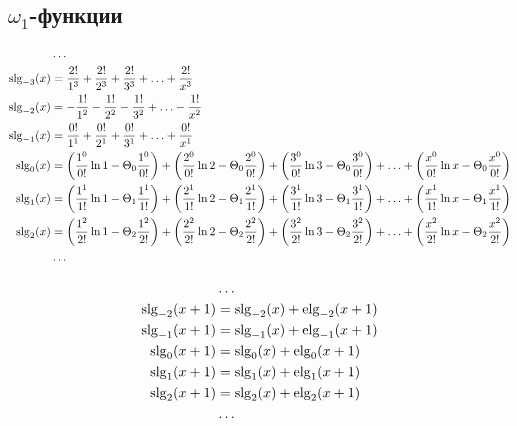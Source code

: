 \subsection{$\omega_1$-функции}

\begin{equation*} \begin{aligned}
&\ldots
\\
\operatorname{slg}_{-3}(x) &=
  \frac{2!}{1^3}
+ \frac{2!}{2^3} 
+ \frac{2!}{3^3} 
+ \ldots 
+ \frac{2!}{x^3}
\\
\operatorname{slg}_{-2}(x) &=
- \frac{1!}{1^2}
- \frac{1!}{2^2} 
- \frac{1!}{3^2} 
+ \ldots 
- \frac{1!}{x^2}
\\
\operatorname{slg}_{-1}(x) &=
  \frac{0!}{1^1}
+ \frac{0!}{2^1} 
+ \frac{0!}{3^1} 
+ \ldots 
+ \frac{0!}{x^1}
\\
\operatorname{slg}_0(x) &=
  \left( \frac{1^0}{0!} \ln{1} - \Theta_0 \frac{1^0}{0!} \right)
+ \left( \frac{2^0}{0!} \ln{2} - \Theta_0 \frac{2^0}{0!} \right) 
+ \left( \frac{3^0}{0!} \ln{3} - \Theta_0 \frac{3^0}{0!} \right) 
+ \ldots 
+ \left( \frac{x^0}{0!} \ln{x} - \Theta_0 \frac{x^0}{0!} \right)
\\
\operatorname{slg}_1(x) &=
  \left(\frac{1^1}{1!} \ln{1} - \Theta_1 \frac{1^1}{1!} \right)
+ \left( \frac{2^1}{1!} \ln{2} - \Theta_1 \frac{2^1}{1!} \right) 
+ \left( \frac{3^1}{1!} \ln{3} - \Theta_1 \frac{3^1}{1!} \right) 
+ \ldots 
+ \left( \frac{x^1}{1!} \ln{x} - \Theta_1 \frac{x^1}{1!} \right)
\\
\operatorname{slg}_2(x) &=
  \left( \frac{1^2}{2!} \ln{1} - \Theta_2 \frac{1^2}{2!} \right)
+ \left( \frac{2^2}{2!} \ln{2} - \Theta_2 \frac{2^2}{2!} \right) 
+ \left( \frac{3^2}{2!} \ln{3} - \Theta_2 \frac{3^2}{2!} \right) 
+ \ldots 
+ \left( \frac{x^2}{2!} \ln{x} - \Theta_2 \frac{x^2}{2!} \right)
\\
&\ldots
\\
\end{aligned} \end{equation*}

\begin{equation*} \begin{aligned}
&\ldots
\\
\operatorname{slg}_{-2}(x + 1) &= 
  \operatorname{slg}_{-2}(x) + \operatorname{elg}_{-2}(x + 1)
\\
\operatorname{slg}_{-1}(x + 1) &= 
  \operatorname{slg}_{-1}(x) + \operatorname{elg}_{-1}(x + 1)
\\
\operatorname{slg}_0(x + 1) &= 
  \operatorname{slg}_0(x) + \operatorname{elg}_0(x + 1)
\\
\operatorname{slg}_1(x + 1) &= 
  \operatorname{slg}_1(x) + \operatorname{elg}_1(x + 1)  
\\
\operatorname{slg}_2(x + 1) &= 
  \operatorname{slg}_2(x) + \operatorname{elg}_2(x + 1)
\\
&\ldots
\\
\end{aligned} \end{equation*}

